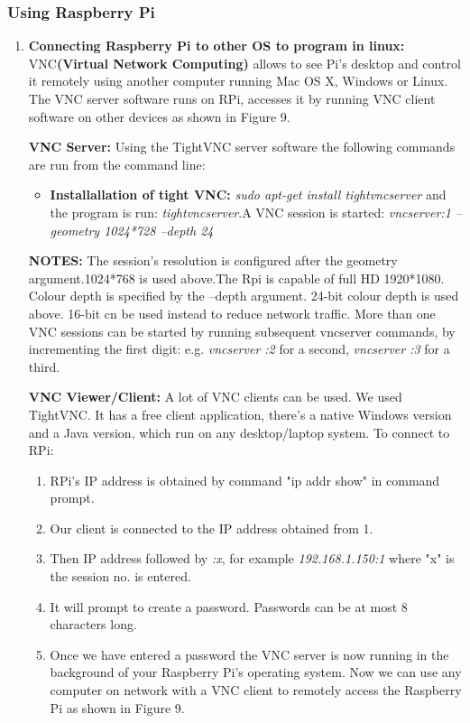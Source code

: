 \documentclass[12pt, a4paper]{article}
\begin{document}
\subsubsection{Using Raspberry Pi}
\begin{enumerate}
\item \textbf{Connecting Raspberry Pi to other OS to program in linux:}
VNC\textbf {(Virtual Network Computing)}
allows to see Pi’s desktop and control it remotely using another computer running Mac OS X, Windows or Linux. The VNC server software runs on  RPi, accesses it by running VNC client software on other devices as shown in Figure 9.

\textbf{VNC Server:}
Using the TightVNC server software the following commands are run from the command line:
\begin{itemize}


\item \textbf{Installallation of tight VNC:} \emph{sudo apt-get install tightvncserver} and the program is run: \emph{tightvncserver}.A VNC session is started: \emph{vncserver:1 --geometry 1024*728 --depth 24}

\end{itemize}
\textbf{NOTES:}
The session’s resolution is configured after the geometry argument.1024*768 is used above.The Rpi is capable of full HD 1920*1080.
Colour depth is specified by the --depth argument. 24-bit colour depth is used above. 16-bit cn be used instead to reduce network traffic.
More than one VNC sessions can be started by running subsequent vncserver commands, by incrementing the first digit: e.g. \emph{vncserver :2} for a second, \emph{ vncserver :3} for a third.

\textbf{VNC Viewer/Client:}
A lot of VNC clients can be used. We used TightVNC. It has a free client application, there’s a native Windows version and a Java version, which run on any desktop/laptop system.
To connect to RPi:
\begin{enumerate}
\item RPi's IP address is obtained by command "ip addr show" in command prompt.
\item Our client is connected to the IP address obtained from 1.
\item Then IP address followed by \emph{:x}, for example \emph{192.168.1.150:1} where "x" is the session no. is entered.
\item It will prompt  to create a password. Passwords can be at most 8 characters long.
\item Once we have entered a password the VNC server is now running in the background of your Raspberry Pi's operating system. Now we can use any computer on  network with a VNC client to remotely access the Raspberry Pi as shown in Figure 9.
\end{enumerate}

\end{enumerate}
\end{document}
